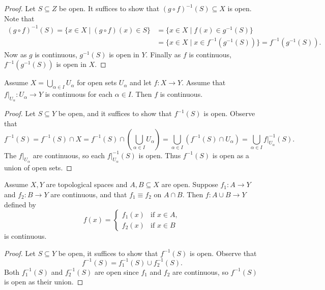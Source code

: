 \begin{proof}
  Let $S \subseteq Z$ be open. It suffices to
  show that $(g \circ f)^{-1}(S) \subseteq X$ is open.
  Note that
  \begin{align*}
    (g \circ f)^{-1}(S)
    = \{x \in X \mid (g \circ f)(x) \in S\}
    &= \{x \in X \mid f(x) \in g^{-1}(S)\} \\
    &= \{x \in X \mid x \in f^{-1}(g^{-1}(S))\}
    = f^{-1}(g^{-1}(S)).
  \end{align*}
  Now as $g$ is continuous, $g^{-1}(S)$ is open in $Y$.
  Finally as $f$ is continuous, $f^{-1}(g^{-1}(S))$ is
  open in $X$.
\end{proof}

\begin{theorem}
  Assume $X = \bigcup_{\alpha \in I} U_\alpha$
  for open sets $U_\alpha$ and let $f : X \to Y$.
  Assume that $f|_{U_\alpha} : U_\alpha \to Y$
  is continuous for each $\alpha \in I$.
  Then $f$ is continuous.
\end{theorem}

\begin{proof}
  Let $S \subseteq Y$ be open, and it suffices
  to show that $f^{-1}(S)$ is open. Observe that
  \[
    f^{-1}(S) = f^{-1}(S) \cap X
    = f^{-1}(S) \cap \left( \bigcup_{\alpha \in I} U_\alpha \right)
    = \bigcup_{\alpha \in I} (f^{-1}(S) \cap U_\alpha)
    = \bigcup_{\alpha \in I} f|_{U_\alpha}^{-1}(S).
  \]
  The $f|_{U_\alpha}$ are continuous,
  so each $f|_{U_\alpha}^{-1}(S)$ is open. Thus
  $f^{-1}(S)$ is open as a union of open sets.
\end{proof}

\begin{theorem}
  Assume $X, Y$ are topological spaces and
  $A, B \subseteq X$ are open. Suppose $f_1 : A \to Y$
  and $f_2 : B \to Y$ are continuous, and that
  $f_1 \equiv f_2$ on $A \cap B$. Then
  $f : A \cup B \to Y$ defined by
  \[
    f(x) =
    \begin{cases}
      f_1(x) & \text{if } x \in A, \\
      f_2(x) & \text{if } x \in B
    \end{cases}
  \]
  is continuous.
\end{theorem}

\begin{proof}
  Let $S \subseteq Y$ be open, it suffices
  to show that $f^{-1}(S)$ is open. Observe that
  \[
    f^{-1}(S) = f_1^{-1}(S) \cup f_2^{-1}(S).
  \]
  Both $f_1^{-1}(S)$ and $f_2^{-1}(S)$ are open
  since $f_1$ and $f_2$ are continuous, so
  $f^{-1}(S)$ is open as their union.
\end{proof}

